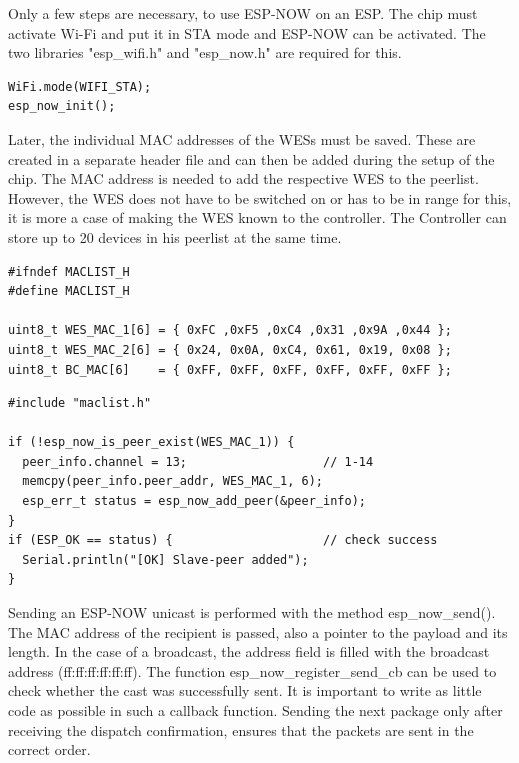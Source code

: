 Only a few steps are necessary, to use ESP-NOW on an ESP.
The chip must activate Wi-Fi and put it in STA mode and ESP-NOW can be activated.
The two libraries "esp\_wifi.h" and "esp\_now.h" are required for this.

\begin{lstlisting}[caption=Init ESP-NOW]
WiFi.mode(WIFI_STA);
esp_now_init();
\end{lstlisting}
\label{lst:init}


Later, the individual MAC addresses of the WESs must be saved.
These are created in a separate header file and can then be added during the setup of the chip.
The MAC address is needed to add the respective WES to the peerlist.
However, the WES does not have to be switched on or has to be in range for this, 
it is more a case of making the WES known to the controller.
The Controller can store up to 20 devices in his peerlist at the same time.

\begin{lstlisting}
#ifndef MACLIST_H
#define MACLIST_H

uint8_t WES_MAC_1[6] = { 0xFC ,0xF5 ,0xC4 ,0x31 ,0x9A ,0x44 };
uint8_t WES_MAC_2[6] = { 0x24, 0x0A, 0xC4, 0x61, 0x19, 0x08 };
uint8_t BC_MAC[6]    = { 0xFF, 0xFF, 0xFF, 0xFF, 0xFF, 0xFF };
\end{lstlisting}
\label{lst:macaddress}

\begin{lstlisting}[caption=Add Peers]
#include "maclist.h"

if (!esp_now_is_peer_exist(WES_MAC_1)) {
  peer_info.channel = 13;                   // 1-14
  memcpy(peer_info.peer_addr, WES_MAC_1, 6);
  esp_err_t status = esp_now_add_peer(&peer_info);
}
if (ESP_OK == status) {                     // check success
  Serial.println("[OK] Slave-peer added"); 
}
\end{lstlisting}

Sending an ESP-NOW unicast is performed with the method esp\_now\_send().
The MAC address of the recipient is passed, also a pointer to the payload and its length.
In the case of a broadcast, the address field is filled with the broadcast address (ff:ff:ff:ff:ff:ff).
The function esp\_now\_register\_send\_cb can be used to check whether the cast was successfully sent.
It is important to write as little code as possible in such a callback function.
Sending the next package only after receiving the dispatch confirmation, 
ensures that the packets are sent in the correct order.

